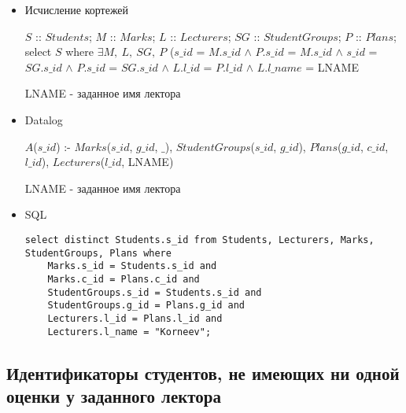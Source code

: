 \documentclass[12pt,a4paper,oneside]{article}
\begin{document}
\begin{itemize}

\item Исчисление кортежей

$S$ :: $Students$; $M$ :: $Marks$; $L$ :: $Lecturers$; $SG$ :: $StudentGroups$; $P$ :: $Plans$; select $S$ where $\exists M,\ L,\ SG,\ P$ ($s\_id$ = $M.s\_id$ $\wedge$ $P.s\_id$ = $M.s\_id$ $\wedge$ $s\_id$ = $SG.s\_id$ $\wedge$ $P.s\_id$ = $SG.s\_id$ $\wedge$ $L.l\_id$ = $P.l\_id$ $\wedge$ $L.l\_name$ = LNAME

LNAME - заданное имя лектора

\item Datalog

$A$($s\_id$) :- $Marks$($s\_id$, $g\_id$, $\_$), $StudentGroups$($s\_id$, $g\_id$), $Plans$($g\_id$, $c\_id$, $l\_id$), $Lecturers$($l\_id$, LNAME)

LNAME - заданное имя лектора

\item SQL

\begin{lstlisting}[label=task3,caption={Задание 3}]
select distinct Students.s_id from Students, Lecturers, Marks, StudentGroups, Plans where
    Marks.s_id = Students.s_id and
    Marks.c_id = Plans.c_id and
    StudentGroups.s_id = Students.s_id and
    StudentGroups.g_id = Plans.g_id and
    Lecturers.l_id = Plans.l_id and
    Lecturers.l_name = "Korneev";
\end{lstlisting}

\end{itemize}

\subsection{Идентификаторы студентов, не имеющих ни одной оценки у заданного лектора}
\end{document}
